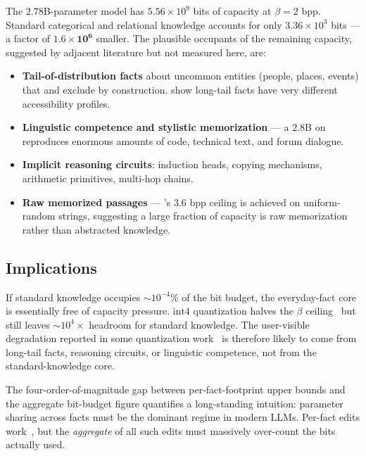 The \(2.78\)B-parameter \pythia model has \(5.56 \times 10^9\) bits of capacity at \(\beta = 2\) bpp. Standard categorical and relational knowledge accounts for only \(3.36 \times 10^3\) bits --- a factor of \(\mathbf{1.6 \times 10^6}\) smaller. The plausible occupants of the remaining capacity, suggested by adjacent literature but not measured here, are:
\begin{itemize}[leftmargin=*,itemsep=0pt,topsep=0pt]
    \item \textbf{Tail-of-distribution facts} about uncommon entities (people, places, events) that \bear and \taxi exclude by construction. \citet{mallen2023nottrust} show long-tail facts have very different accessibility profiles.
    \item \textbf{Linguistic competence and stylistic memorization} --- a \(2.8\)B \pythia on \pile reproduces enormous amounts of code, technical text, and forum dialogue.
    \item \textbf{Implicit reasoning circuits}: induction heads, copying mechanisms, arithmetic primitives, multi-hop chains.
    \item \textbf{Raw memorized passages} --- \citet{morris2025memorize}'s \(3.6\) bpp ceiling is achieved on uniform-random strings, suggesting a large fraction of capacity is raw memorization rather than abstracted knowledge.
\end{itemize}

\subsection{Implications}

 If standard knowledge occupies \(\sim 10^{-4}\%\) of the bit budget, the everyday-fact core is essentially free of capacity pressure. \(\text{int}4\) quantization halves the \(\beta\) ceiling~\citep{allenzhu2024knowledge} but still leaves \(\sim 10^4 \times\) headroom for standard knowledge. The user-visible degradation reported in some quantization work~\citep{hong2025specialization} is therefore likely to come from long-tail facts, reasoning circuits, or linguistic competence, not from the standard-knowledge core.

 The four-order-of-magnitude gap between per-fact-footprint upper bounds and the aggregate bit-budget figure quantifies a long-standing intuition: parameter sharing across facts must be the dominant regime in modern LLMs. Per-fact \rome edits work~\citep{meng2022rome}, but the \emph{aggregate} of all such edits must massively over-count the bits actually used.

